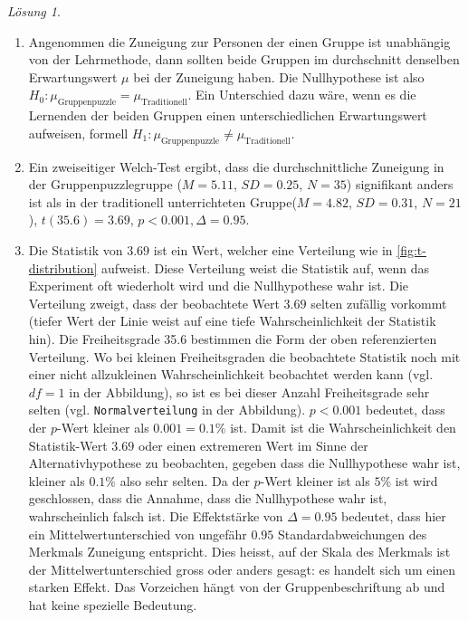 \documentclass[
]{book}
\providecommand{\tightlist}{%
  \setlength{\itemsep}{0pt}\setlength{\parskip}{0pt}}
\theoremstyle{definition}
\theoremstyle{definition}
\theoremstyle{definition}
\theoremstyle{definition}
\theoremstyle{remark}
\newtheorem*{solution}{Lösung}
\begin{document}
\begin{solution}
\begin{enumerate}
\def\labelenumi{\alph{enumi})}
\tightlist
\item
  Angenommen die Zuneigung zur Personen der einen Gruppe ist unabhängig von der Lehrmethode, dann sollten beide Gruppen im durchschnitt denselben Erwartungswert \(\mu\) bei der Zuneigung haben. Die Nullhypothese ist also \(H_0: \mu_\text{Gruppenpuzzle} = \mu_\text{Traditionell}\). Ein Unterschied dazu wäre, wenn es die Lernenden der beiden Gruppen einen unterschiedlichen Erwartungswert aufweisen, formell \(H_1: \mu_\text{Gruppenpuzzle} \neq \mu_\text{Traditionell}\).
\item
  Ein zweiseitiger Welch-Test ergibt, dass die durchschnittliche Zuneigung in der Gruppenpuzzlegruppe (\(M = 5.11\), \(SD = 0.25\), \(N = 35\)) signifikant anders ist als in der traditionell unterrichteten Gruppe(\(M = 4.82\), \(SD = 0.31\), \(N = 21\)), \(t(35.6) = 3.69\), \(p < 0.001, \Delta = 0.95\).
\item
  Die Statistik von \(3.69\) ist ein Wert, welcher eine Verteilung wie in \ref{fig:t-distribution} aufweist. Diese Verteilung weist die Statistik auf, wenn das Experiment oft wiederholt wird und die Nullhypothese wahr ist. Die Verteilung zweigt, dass der beobachtete Wert \(3.69\) selten zufällig vorkommt (tiefer Wert der Linie weist auf eine tiefe Wahrscheinlichkeit der Statistik hin). Die Freiheitsgrade 35.6 bestimmen die Form der oben referenzierten Verteilung. Wo bei kleinen Freiheitsgraden die beobachtete Statistik noch mit einer nicht allzukleinen Wahrscheinlichkeit beobachtet werden kann (vgl. \(df = 1\) in der Abbildung), so ist es bei dieser Anzahl Freiheitsgrade sehr selten (vgl. \texttt{Normalverteilung} in der Abbildung). \(p < 0.001\) bedeutet, dass der \(p\)-Wert kleiner als \(0.001 = 0.1\%\) ist. Damit ist die Wahrscheinlichkeit den Statistik-Wert \(3.69\) oder einen extremeren Wert im Sinne der Alternativhypothese zu beobachten, gegeben dass die Nullhypothese wahr ist, kleiner als \(0.1\%\) also sehr selten. Da der \(p\)-Wert kleiner ist als \(5\%\) ist wird geschlossen, dass die Annahme, dass die Nullhypothese wahr ist, wahrscheinlich falsch ist. Die Effektstärke von \(\Delta = 0.95\) bedeutet, dass hier ein Mittelwertunterschied von ungefähr \(0.95\) Standardabweichungen des Merkmals Zuneigung entspricht. Dies heisst, auf der Skala des Merkmals ist der Mittelwertunterschied gross oder anders gesagt: es handelt sich um einen starken Effekt. Das Vorzeichen hängt von der Gruppenbeschriftung ab und hat keine spezielle Bedeutung.
\end{enumerate}

\end{solution}
\end{document}
